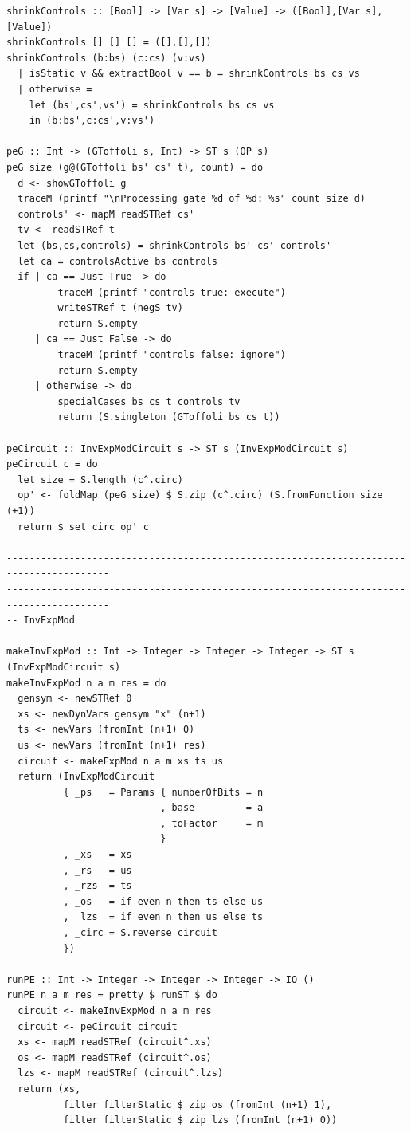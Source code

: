 \documentclass{article}
\begin{document}
\begin{verbatim}
shrinkControls :: [Bool] -> [Var s] -> [Value] -> ([Bool],[Var s],[Value])
shrinkControls [] [] [] = ([],[],[])
shrinkControls (b:bs) (c:cs) (v:vs)
  | isStatic v && extractBool v == b = shrinkControls bs cs vs
  | otherwise =
    let (bs',cs',vs') = shrinkControls bs cs vs
    in (b:bs',c:cs',v:vs')

peG :: Int -> (GToffoli s, Int) -> ST s (OP s)
peG size (g@(GToffoli bs' cs' t), count) = do
  d <- showGToffoli g
  traceM (printf "\nProcessing gate %d of %d: %s" count size d)
  controls' <- mapM readSTRef cs'
  tv <- readSTRef t
  let (bs,cs,controls) = shrinkControls bs' cs' controls'
  let ca = controlsActive bs controls
  if | ca == Just True -> do
         traceM (printf "controls true: execute")
         writeSTRef t (negS tv)
         return S.empty
     | ca == Just False -> do
         traceM (printf "controls false: ignore")
         return S.empty
     | otherwise -> do
         specialCases bs cs t controls tv
         return (S.singleton (GToffoli bs cs t))

peCircuit :: InvExpModCircuit s -> ST s (InvExpModCircuit s)
peCircuit c = do
  let size = S.length (c^.circ)
  op' <- foldMap (peG size) $ S.zip (c^.circ) (S.fromFunction size (+1))
  return $ set circ op' c

----------------------------------------------------------------------------------------
----------------------------------------------------------------------------------------
-- InvExpMod 

makeInvExpMod :: Int -> Integer -> Integer -> Integer -> ST s (InvExpModCircuit s)
makeInvExpMod n a m res = do
  gensym <- newSTRef 0
  xs <- newDynVars gensym "x" (n+1)
  ts <- newVars (fromInt (n+1) 0)
  us <- newVars (fromInt (n+1) res)
  circuit <- makeExpMod n a m xs ts us
  return (InvExpModCircuit
          { _ps   = Params { numberOfBits = n
                           , base         = a
                           , toFactor     = m
                           }
          , _xs   = xs
          , _rs   = us
          , _rzs  = ts
          , _os   = if even n then ts else us
          , _lzs  = if even n then us else ts
          , _circ = S.reverse circuit
          })

runPE :: Int -> Integer -> Integer -> Integer -> IO ()
runPE n a m res = pretty $ runST $ do
  circuit <- makeInvExpMod n a m res 
  circuit <- peCircuit circuit
  xs <- mapM readSTRef (circuit^.xs)
  os <- mapM readSTRef (circuit^.os)
  lzs <- mapM readSTRef (circuit^.lzs)
  return (xs,
          filter filterStatic $ zip os (fromInt (n+1) 1),
          filter filterStatic $ zip lzs (fromInt (n+1) 0))


\end{verbatim}
\end{document}
